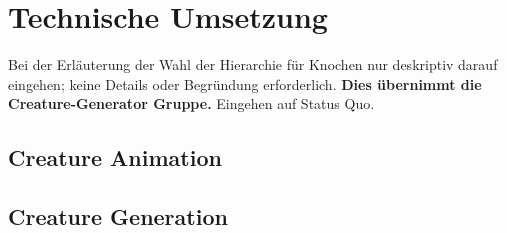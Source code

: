\chapter{Technische Umsetzung}
Bei der Erläuterung der Wahl der Hierarchie für Knochen nur deskriptiv darauf eingehen; keine Details oder Begründung erforderlich. \textbf{Dies übernimmt die Creature-Generator Gruppe.}
Eingehen auf Status Quo.
\section{Creature Animation}

\section{Creature Generation}
